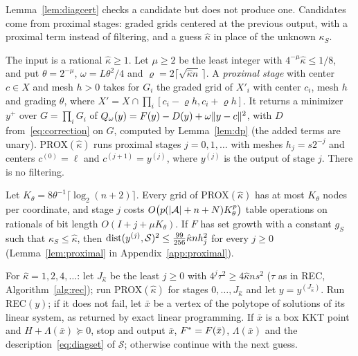 Lemma~\ref{lem:diagcert} checks a candidate but does not produce one.
Candidates come from proximal stages: graded grids centered at the previous
output, with a proximal term instead of filtering, and a guess $\hat\kappa$
in place of the unknown $\kappa_S$.

\begin{algorithm}\label{alg:prox}
The input is a rational $\hat\kappa\ge1$. Let $\mu\ge2$ be the least integer
with $4^{-\mu}\hat\kappa\le1/8$, and put $\theta=2^{-\mu}$,
$\omega=L\theta^2/4$ and $\varrho=2\lceil\sqrt{\hat\kappa n}\,\rceil$. A
\emph{proximal stage} with center $c\in X$ and mesh $h>0$ takes for $G_i$ the
graded grid of $X'_i$ with center $c_i$, mesh $h$ and grading $\theta$, where
$X'=X\cap\prod_i[c_i-\varrho h,c_i+\varrho h]$. It returns a minimizer $y^+$
over $G=\prod_iG_i$ of $Q_\omega(y)=F(y)-D(y)+\omega\lVert y-c\rVert^2$, with $D$
from~\eqref{eq:correction} on $G$, computed by Lemma~\ref{lem:dp} (the added
terms are unary). PROX$(\hat\kappa)$ runs proximal stages $j=0,1,\dots$ with
meshes $h_j=s2^{-j}$ and centers $c^{(0)}=\ell$ and $c^{(j+1)}=y^{(j)}$,
where $y^{(j)}$ is the output of stage $j$. There is no filtering.
\end{algorithm}

Let $K_\theta=8\theta^{-1}\lceil\log_2(n+2)\rceil$. Every grid of
PROX$(\hat\kappa)$ has at most $K_\theta$ nodes per coordinate, and stage $j$
costs $O\bigl(p(\lvert \mathcal A\rvert+n+N)K_\theta^p\bigr)$ table operations on
rationals of bit length $O(I+j+\mu K_\theta)$. If $F$ has set growth with a
constant $g_S$ such that $\kappa_S\le\hat\kappa$, then
$\operatorname{dist}(y^{(j)},\mathcal S)^2\le\frac{99}{256}\hat\kappa nh_j^2$ for every
$j\ge0$ (Lemma~\ref{lem:proximal} in Appendix~\ref{app:proximal}).

\begin{algorithm}\label{alg:disc}
For $\hat\kappa=1,2,4,\dots$: let $J_{\hat\kappa}$ be the least $j\ge0$ with
$4^j\tau^2\ge4\hat\kappa ns^2$ ($\tau$ as in REC, Algorithm~\ref{alg:rec});
run PROX$(\hat\kappa)$ for stages $0,\dots,J_{\hat\kappa}$ and let
$y=y^{(J_{\hat\kappa})}$. Run REC$(y)$; if it does not fail, let $\bar x$ be
a vertex of the polytope of solutions of its linear system, as returned by
exact linear programming. If $\bar x$ is a box KKT point and
$H+\Lambda(\bar x)\succeq0$, stop and output $\bar x$, $F^{*}=F(\bar x)$,
$\Lambda(\bar x)$ and the description~\eqref{eq:diagset} of $\mathcal S$;
otherwise continue with the next guess.
\end{algorithm}

